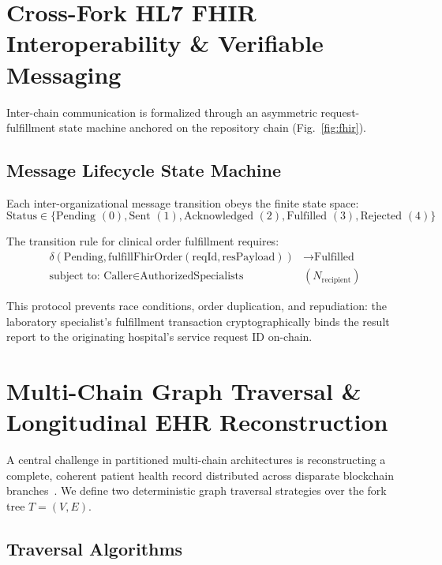 \documentclass[conference]{IEEEtran}
\theoremstyle{definition}
\begin{document}
\section{Cross-Fork HL7 FHIR Interoperability \& Verifiable Messaging}

Inter-chain communication is formalized through an asymmetric request-fulfillment state machine anchored on the repository chain (Fig.~\ref{fig:fhir}).

\subsection{Message Lifecycle State Machine}
Each inter-organizational message transition obeys the finite state space:
\begin{equation}
\text{Status} \in \{\text{Pending } (0), \text{Sent } (1), \text{Acknowledged } (2), \text{Fulfilled } (3), \text{Rejected } (4)\}
\end{equation}

The transition rule for clinical order fulfillment requires:
\begin{equation}
\begin{aligned}
\delta(\text{Pending}, \text{fulfillFhirOrder}(\text{reqId}, \text{resPayload})) &\longrightarrow \text{Fulfilled} \\
\text{subject to: } \text{Caller} \in \text{AuthorizedSpecialists}&(N_{\text{recipient}})
\end{aligned}
\end{equation}

This protocol prevents race conditions, order duplication, and repudiation: the laboratory specialist's fulfillment transaction cryptographically binds the result report to the originating hospital's service request ID on-chain.

\section{Multi-Chain Graph Traversal \& Longitudinal EHR Reconstruction}

A central challenge in partitioned multi-chain architectures is reconstructing a complete, coherent patient health record distributed across disparate blockchain branches~\cite{cormen2022introduction}. We define two deterministic graph traversal strategies over the fork tree $T = (V, E)$.

\subsection{Traversal Algorithms}
\end{document}
